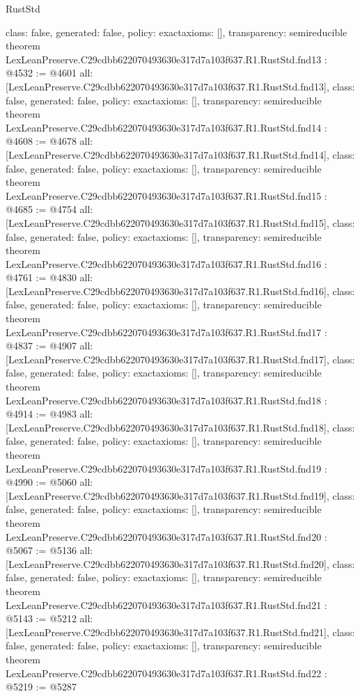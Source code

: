 \begin{lexlean}{RustStd}
\begin{coremodule}
{  class: false,
  generated: false,
  policy: exact{axioms: []},
  transparency: semireducible
}
theorem LexLeanPreserve.C29cdbb622070493630e317d7a103f637.R1.RustStd.fnd13 : @4532 := @4601 {
  all: [LexLeanPreserve.C29cdbb622070493630e317d7a103f637.R1.RustStd.fnd13],
  class: false,
  generated: false,
  policy: exact{axioms: []},
  transparency: semireducible
}
theorem LexLeanPreserve.C29cdbb622070493630e317d7a103f637.R1.RustStd.fnd14 : @4608 := @4678 {
  all: [LexLeanPreserve.C29cdbb622070493630e317d7a103f637.R1.RustStd.fnd14],
  class: false,
  generated: false,
  policy: exact{axioms: []},
  transparency: semireducible
}
theorem LexLeanPreserve.C29cdbb622070493630e317d7a103f637.R1.RustStd.fnd15 : @4685 := @4754 {
  all: [LexLeanPreserve.C29cdbb622070493630e317d7a103f637.R1.RustStd.fnd15],
  class: false,
  generated: false,
  policy: exact{axioms: []},
  transparency: semireducible
}
theorem LexLeanPreserve.C29cdbb622070493630e317d7a103f637.R1.RustStd.fnd16 : @4761 := @4830 {
  all: [LexLeanPreserve.C29cdbb622070493630e317d7a103f637.R1.RustStd.fnd16],
  class: false,
  generated: false,
  policy: exact{axioms: []},
  transparency: semireducible
}
theorem LexLeanPreserve.C29cdbb622070493630e317d7a103f637.R1.RustStd.fnd17 : @4837 := @4907 {
  all: [LexLeanPreserve.C29cdbb622070493630e317d7a103f637.R1.RustStd.fnd17],
  class: false,
  generated: false,
  policy: exact{axioms: []},
  transparency: semireducible
}
theorem LexLeanPreserve.C29cdbb622070493630e317d7a103f637.R1.RustStd.fnd18 : @4914 := @4983 {
  all: [LexLeanPreserve.C29cdbb622070493630e317d7a103f637.R1.RustStd.fnd18],
  class: false,
  generated: false,
  policy: exact{axioms: []},
  transparency: semireducible
}
theorem LexLeanPreserve.C29cdbb622070493630e317d7a103f637.R1.RustStd.fnd19 : @4990 := @5060 {
  all: [LexLeanPreserve.C29cdbb622070493630e317d7a103f637.R1.RustStd.fnd19],
  class: false,
  generated: false,
  policy: exact{axioms: []},
  transparency: semireducible
}
theorem LexLeanPreserve.C29cdbb622070493630e317d7a103f637.R1.RustStd.fnd20 : @5067 := @5136 {
  all: [LexLeanPreserve.C29cdbb622070493630e317d7a103f637.R1.RustStd.fnd20],
  class: false,
  generated: false,
  policy: exact{axioms: []},
  transparency: semireducible
}
theorem LexLeanPreserve.C29cdbb622070493630e317d7a103f637.R1.RustStd.fnd21 : @5143 := @5212 {
  all: [LexLeanPreserve.C29cdbb622070493630e317d7a103f637.R1.RustStd.fnd21],
  class: false,
  generated: false,
  policy: exact{axioms: []},
  transparency: semireducible
}
theorem LexLeanPreserve.C29cdbb622070493630e317d7a103f637.R1.RustStd.fnd22 : @5219 := @5287 {
}
\end{coremodule}
\end{lexlean}
